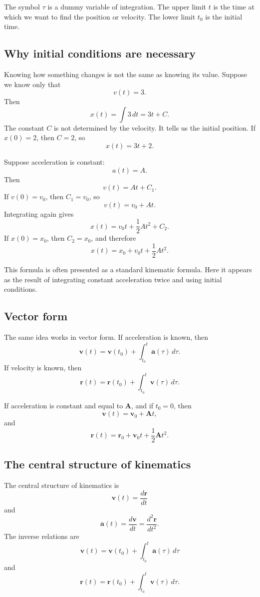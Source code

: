 The symbol \(\tau\) is a dummy variable of integration. The upper limit \(t\) is the time at which we want to find the position or velocity. The lower limit \(t_0\) is the initial time.

\subsection{Why initial conditions are necessary}

Knowing how something changes is not the same as knowing its value. Suppose we know only that
\[
v(t)=3.
\]
Then
\[
x(t)=\int 3\,dt=3t+C.
\]
The constant \(C\) is not determined by the velocity. It tells us the initial position. If \(x(0)=2\), then \(C=2\), so
\[
x(t)=3t+2.
\]

\begin{examplebox}
Suppose acceleration is constant:
\[
a(t)=A.
\]
Then
\[
v(t)=At+C_1.
\]
If \(v(0)=v_0\), then \(C_1=v_0\), so
\[
v(t)=v_0+At.
\]
Integrating again gives
\[
x(t)=v_0t+\frac{1}{2}At^2+C_2.
\]
If \(x(0)=x_0\), then \(C_2=x_0\), and therefore
\[
x(t)=x_0+v_0t+\frac{1}{2}At^2.
\]
\end{examplebox}

This formula is often presented as a standard kinematic formula. Here it appears as the result of integrating constant acceleration twice and using initial conditions.

\subsection{Vector form}

The same idea works in vector form. If acceleration is known, then
\[
\mathbf{v}(t)
=
\mathbf{v}(t_0)+\int_{t_0}^{t}\mathbf{a}(\tau)\,d\tau.
\]
If velocity is known, then
\[
\mathbf{r}(t)
=
\mathbf{r}(t_0)+\int_{t_0}^{t}\mathbf{v}(\tau)\,d\tau.
\]

If acceleration is constant and equal to \(\mathbf{A}\), and if \(t_0=0\), then
\[
\mathbf{v}(t)=\mathbf{v}_0+\mathbf{A}t,
\]
and
\[
\mathbf{r}(t)=\mathbf{r}_0+\mathbf{v}_0t+\frac{1}{2}\mathbf{A}t^2.
\]

\subsection{The central structure of kinematics}

The central structure of kinematics is
\[
\boxed{\mathbf{v}(t)=\frac{d\mathbf{r}}{dt}}
\]
and
\[
\boxed{\mathbf{a}(t)=\frac{d\mathbf{v}}{dt}=\frac{d^2\mathbf{r}}{dt^2}}.
\]
The inverse relations are
\[
\boxed{
\mathbf{v}(t)
=
\mathbf{v}(t_0)+\int_{t_0}^{t}\mathbf{a}(\tau)\,d\tau
}
\]
and
\[
\boxed{
\mathbf{r}(t)
=
\mathbf{r}(t_0)+\int_{t_0}^{t}\mathbf{v}(\tau)\,d\tau
}.
\]


